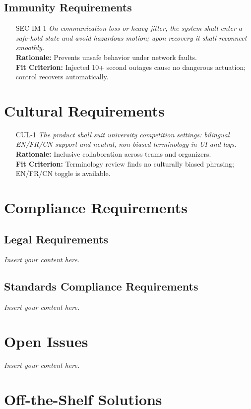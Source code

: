 \documentclass[12pt]{article}
\newcommand{\lips}{\textit{Insert your content here.}}
\begin{document}
\subsection{Immunity Requirements}
\begin{itemize}[leftmargin=*]
  \item[SEC-IM-1] \emph{On communication loss or heavy jitter, the system shall enter a safe-hold state and avoid hazardous motion; upon recovery it shall reconnect smoothly.}\\
  \textbf{Rationale:} Prevents unsafe behavior under network faults.\\
  \textbf{Fit Criterion:} Injected 10+ second outages cause no dangerous actuation; control recovers automatically.
\end{itemize}

\section{Cultural Requirements}
\begin{itemize}[leftmargin=*]
  \item[CUL-1] \emph{The product shall suit university competition settings: bilingual EN/FR/CN support and neutral, non-biased terminology in UI and logs.}\\
  \textbf{Rationale:} Inclusive collaboration across teams and organizers.\\
  \textbf{Fit Criterion:} Terminology review finds no culturally biased phrasing; EN/FR/CN toggle is available.
\end{itemize}

\section{Compliance Requirements}
\subsection{Legal Requirements}
\lips
\subsection{Standards Compliance Requirements}
\lips

\section{Open Issues}
\lips

\section{Off-the-Shelf Solutions}
\end{document}

